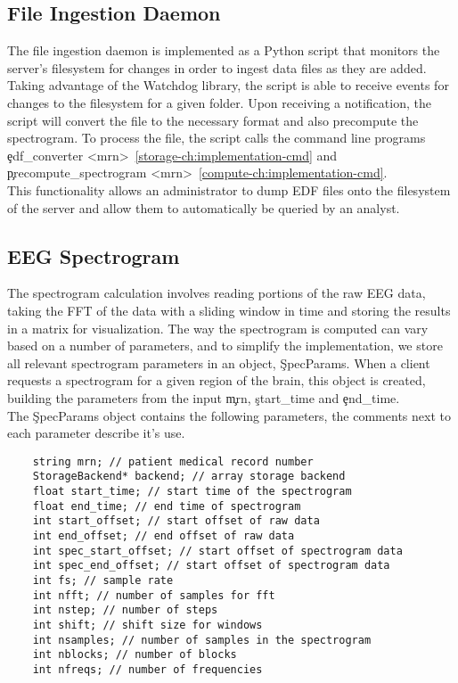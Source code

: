 \subsection{File Ingestion Daemon}

The file ingestion daemon is implemented as a Python script that monitors the
server's filesystem for changes in order to ingest data files as they are
added. Taking advantage of the Watchdog \cite{watchdog} library, the script is
able to receive events for changes to the filesystem for a given folder. Upon
receiving a notification, the script will convert the file to the necessary
format and also precompute the spectrogram. To process the file, the script
calls the command line programs \c{edf\_converter
  <mrn>}~\ref{storage-ch:implementation-cmd} and \c{precompute\_spectrogram
  <mrn>}~\ref{compute-ch:implementation-cmd}. \\

This functionality allows an administrator to dump EDF files onto the
filesystem of the server and allow them to automatically be queried by an
analyst.

\subsection{EEG Spectrogram}\label{compute-ch:implementation-spectrogram}

The spectrogram calculation involves reading portions of the raw EEG data,
taking the FFT of the data with a sliding window in time and storing the
results in a matrix for visualization. The way the spectrogram is computed can
vary based on a number of parameters, and to simplify the implementation, we
store all relevant spectrogram parameters in an object, \c{SpecParams}. When a
client requests a spectrogram for a given region of the brain, this object is
created, building the parameters from the input \c{mrn}, \c{start\_time} and
\c{end\_time}. \\

The \c{SpecParams} object contains the following parameters, the comments next
to each parameter describe it's use.

\begin{lstlisting}
    string mrn; // patient medical record number
    StorageBackend* backend; // array storage backend
    float start_time; // start time of the spectrogram
    float end_time; // end time of spectrogram
    int start_offset; // start offset of raw data
    int end_offset; // end offset of raw data
    int spec_start_offset; // start offset of spectrogram data
    int spec_end_offset; // start offset of spectrogram data
    int fs; // sample rate
    int nfft; // number of samples for fft
    int nstep; // number of steps
    int shift; // shift size for windows
    int nsamples; // number of samples in the spectrogram
    int nblocks; // number of blocks
    int nfreqs; // number of frequencies
\end{lstlisting}


